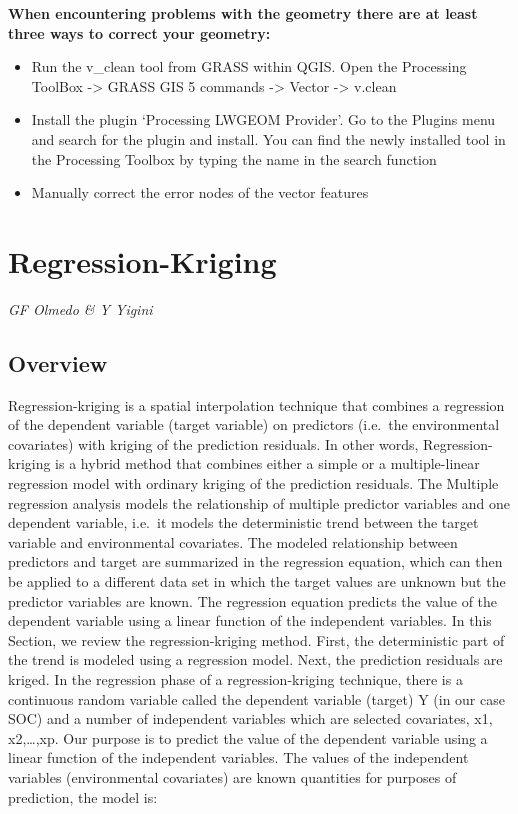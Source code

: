 \documentclass[10pt,b5paper,]{book}
\providecommand{\tightlist}{%
  \setlength{\itemsep}{0pt}\setlength{\parskip}{0pt}}
\theoremstyle{definition}
\theoremstyle{definition}
\theoremstyle{definition}
\theoremstyle{remark}
\begin{document}
\textbf{When encountering problems with the geometry there are at least
three ways to correct your geometry:}

\begin{itemize}
\tightlist
\item
  Run the v\_clean tool from GRASS within QGIS. Open the Processing
  ToolBox -\textgreater{} GRASS GIS 5 commands -\textgreater{} Vector
  -\textgreater{} v.clean
\item
  Install the plugin `Processing LWGEOM Provider'. Go to the Plugins
  menu and search for the plugin and install. You can find the newly
  installed tool in the Processing Toolbox by typing the name in the
  search function
\item
  Manually correct the error nodes of the vector features
\end{itemize}

\clearpage

\hypertarget{RK}{%
\section{Regression-Kriging}\label{RK}}

\emph{GF Olmedo \& Y Yigini}

\hypertarget{overview-1}{%
\subsection{Overview}\label{overview-1}}

Regression-kriging is a spatial interpolation technique that combines a
regression of the dependent variable (target variable) on predictors
(i.e.~the environmental covariates) with kriging of the prediction
residuals. In other words, Regression-kriging is a hybrid method that
combines either a simple or a multiple-linear regression model with
ordinary kriging of the prediction residuals. The Multiple regression
analysis models the relationship of multiple predictor variables and one
dependent variable, i.e.~it models the deterministic trend between the
target variable and environmental covariates. The modeled relationship
between predictors and target are summarized in the regression equation,
which can then be applied to a different data set in which the target
values are unknown but the predictor variables are known. The regression
equation predicts the value of the dependent variable using a linear
function of the independent variables. In this Section, we review the
regression-kriging method. First, the deterministic part of the trend is
modeled using a regression model. Next, the prediction residuals are
kriged. In the regression phase of a regression-kriging technique, there
is a continuous random variable called the dependent variable (target) Y
(in our case SOC) and a number of independent variables which are
selected covariates, x1, x2,\ldots{},xp. Our purpose is to predict the
value of the dependent variable using a linear function of the
independent variables. The values of the independent variables
(environmental covariates) are known quantities for purposes of
prediction, the model is:
\end{document}

